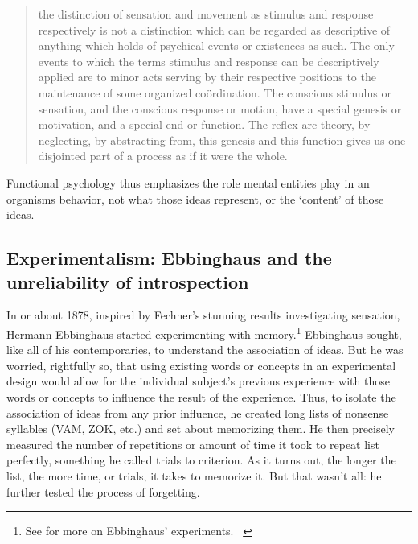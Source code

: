 \begin{refsection}
\begin{quote}

the distinction of sensation and movement as stimulus and response respectively is not a distinction which can be regarded as descriptive of anything which holds of psychical events or existences as such. The only events to which the terms stimulus and response can be descriptively applied are to minor acts serving by their respective positions to the maintenance of some organized coördination. The conscious stimulus or sensation, and the conscious response or motion, have a special genesis or motivation, and a special end or function. The reflex arc theory, by neglecting, by abstracting from, this genesis and this function gives us one disjointed part of a process as if it were the whole. ~\citep[p. 370]{Dewey:1896vt}
\end{quote}

Functional psychology thus emphasizes the role mental entities play in an organisms behavior, not what those ideas represent, or the `content' of those ideas.~\citep{Dewey:gu}~\citep{Dewey:1916tl}

\subsection{Experimentalism: Ebbinghaus and the unreliability of introspection}
\label{experimentalism:ebbinghausandtheunreliabilityofintrospection}

In or about 1878, inspired by Fechner's stunning results investigating sensation, Hermann Ebbinghaus started experimenting with memory.\footnote{See  for more on Ebbinghaus’ experiments. ~\citep{Ebbinghaus:1885ud}} Ebbinghaus sought, like all of his contemporaries, to understand the association of ideas. But he was worried, rightfully so, that using existing words or concepts in an experimental design would allow for the individual subject's previous experience with those words or concepts to influence the result of the experience. Thus, to isolate the association of ideas from any prior influence, he created long lists of nonsense syllables (VAM, ZOK, etc.) and set about memorizing them. He then precisely measured the number of repetitions or amount of time it took to repeat list perfectly, something he called trials to criterion. As it turns out, the longer the list, the more time, or trials, it takes to memorize it. But that wasn't all: he further tested the process of forgetting.


\end{refsection}
